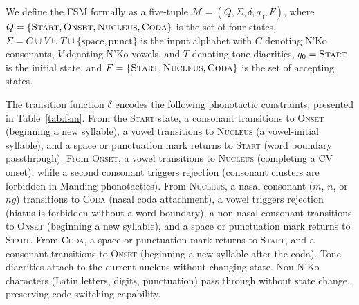 \documentclass[11pt]{article}
\newcommand{\nko}{N'Ko}
\begin{document}
We define the FSM formally as a five-tuple $\mathcal{M} = (Q, \Sigma, \delta, q_0, F)$, where $Q = \{\textsc{Start}, \textsc{Onset}, \textsc{Nucleus}, \textsc{Coda}\}$ is the set of four states, $\Sigma = C \cup V \cup T \cup \{\text{space}, \text{punct}\}$ is the input alphabet with $C$ denoting \nko{} consonants, $V$ denoting \nko{} vowels, and $T$ denoting tone diacritics, $q_0 = \textsc{Start}$ is the initial state, and $F = \{\textsc{Start}, \textsc{Nucleus}, \textsc{Coda}\}$ is the set of accepting states.

The transition function $\delta$ encodes the following phonotactic constraints, presented in Table~\ref{tab:fsm}. From the \textsc{Start} state, a consonant transitions to \textsc{Onset} (beginning a new syllable), a vowel transitions to \textsc{Nucleus} (a vowel-initial syllable), and a space or punctuation mark returns to \textsc{Start} (word boundary passthrough). From \textsc{Onset}, a vowel transitions to \textsc{Nucleus} (completing a CV onset), while a second consonant triggers rejection (consonant clusters are forbidden in Manding phonotactics). From \textsc{Nucleus}, a nasal consonant ($m$, $n$, or $ng$) transitions to \textsc{Coda} (nasal coda attachment), a vowel triggers rejection (hiatus is forbidden without a word boundary), a non-nasal consonant transitions to \textsc{Onset} (beginning a new syllable), and a space or punctuation mark returns to \textsc{Start}. From \textsc{Coda}, a space or punctuation mark returns to \textsc{Start}, and a consonant transitions to \textsc{Onset} (beginning a new syllable after the coda). Tone diacritics attach to the current nucleus without changing state. Non-\nko{} characters (Latin letters, digits, punctuation) pass through without state change, preserving code-switching capability.
\end{document}
